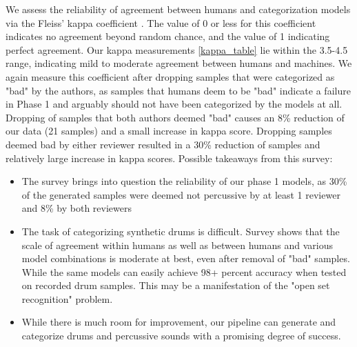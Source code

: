 \documentclass{nime-alternate} %
\begin{document}
We assess the reliability of agreement between humans and categorization models via the Fleiss' kappa coefficient \cite{fleiss1971measuring}. The value of 0 or less for this coefficient indicates no agreement beyond random chance, and the value of 1 indicating perfect agreement. Our kappa measurements \ref{kappa_table} lie within the 3.5-4.5 range, indicating mild to moderate agreement between humans and machines. We again measure this coefficient after dropping samples that were categorized as "bad" by the authors, as samples that humans deem to be "bad" indicate a failure in Phase 1 and arguably should not have been categorized by the models at all. Dropping of samples that both authors deemed "bad" causes an 8\% reduction of our data (21 samples) and a small increase in kappa score. Dropping samples deemed bad by either reviewer resulted in a 30\% reduction of samples and relatively large increase in kappa scores. 
Possible takeaways from this survey:
\begin{itemize}
    \item The survey brings into question the reliability of our phase 1 models, as 30\% of the generated samples were deemed not percussive by at least 1 reviewer and 8\% by both reviewers
    \item The task of categorizing synthetic drums is difficult. Survey shows that the scale of agreement within humans as well as between humans and various model combinations is moderate at best, even after removal of "bad" samples.  While the same models can easily achieve 98+ percent accuracy when tested on recorded drum samples. This may be a manifestation of the "open set recognition" problem. 
    \item While there is much room for improvement, our pipeline can generate and categorize drums and percussive sounds with a promising degree of success. 
\end{itemize}
\begin{center}

\begin{table}
\caption{\label{kappa_table}Table of Fleiss' kappa coefficient to measure the degree of agreement between humans (HvH), humans with FC model (H+FC), humans with CNNLSTM model, humans with all models (H+ALL), and the 3 models }
\end{table}
\end{center}
\end{document}
